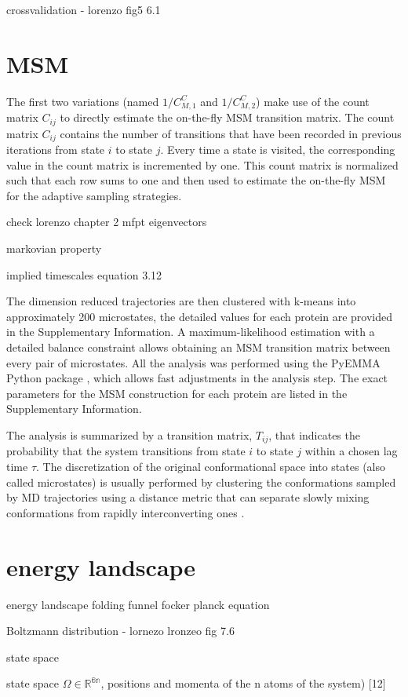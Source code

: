 crossvalidation  - lorenzo fig5 6.1


\section{MSM}

The first two variations (named $1/C_{M,1}^C$ and $1/C_{M,2}^C$) make use of the count
matrix $C_{ij}$ to directly estimate the on-the-fly MSM transition matrix. The count matrix
$C_{ij}$ contains the number of transitions that have been recorded in previous
iterations from state $i$ to state $j$. Every time a state is visited, the corresponding value
in the count matrix is incremented by one. This count matrix is normalized such
that each row sums to one and then used to estimate the on-the-fly MSM for the
adaptive sampling strategies.


check  lorenzo chapter 2
mfpt
eigenvectors

markovian property

implied timescales equation 3.12


The dimension reduced trajectories are then clustered with k-means into approximately 200 microstates,
the detailed values for each protein are provided in the Supplementary Information. 
A  maximum-likelihood estimation with a detailed balance
constraint \cite{prinz2011markov} allows obtaining an MSM transition matrix 
between every pair of microstates. All the analysis was
performed using the PyEMMA Python package \cite{scherer2015pyemma}, which
allows fast adjustments in the analysis step. The exact parameters for the MSM
construction for each protein are listed in the
Supplementary Information.


The analysis is summarized by a transition matrix,
$T_{ij}$, that indicates the probability that the system transitions from state
$i$ to state $j$ within a chosen lag time $\tau$. The discretization of the
original conformational space into states (also called microstates) is usually
performed by clustering the conformations sampled by MD trajectories using
a distance metric that can separate slowly mixing conformations from rapidly
interconverting ones \cite{noe2016commute, Noe2015}.


\section{energy landscape }
energy landscape 
folding funnel \cite{bryngelson1995p}
focker planck equation

Boltzmann distribution - lornezo
lronzeo fig 7.6

state space

state space $\varOmega\in\mathbb{R^{6n}}$, positions and momenta of the n atoms of the system)
[12]